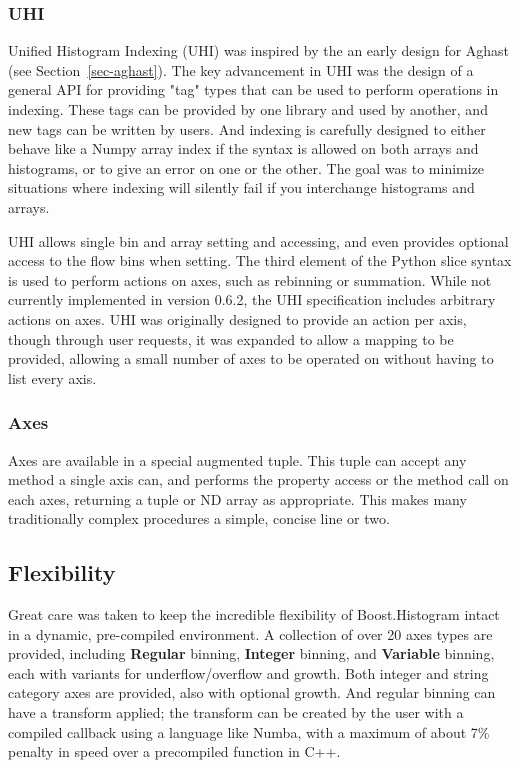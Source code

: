 \documentclass{webofc}
\begin{document}
\subsubsection{UHI}
\label{sec-bhp-uhi}

Unified Histogram Indexing (UHI) was inspired by the an early design for Aghast (see Section~\ref{sec-aghast}). The key advancement in UHI was the design of a general API for providing "tag" types that can be used to perform operations in indexing. These tags can be provided by one library and used by another, and new tags can be written by users. And indexing is carefully designed to either behave like a Numpy array index if the syntax is allowed on both arrays and histograms, or to give an error on one or the other. The goal was to minimize situations where indexing will silently fail if you interchange histograms and arrays.

UHI allows single bin and array setting and accessing, and even provides optional access to the flow bins when setting. The third element of the Python slice syntax is used to perform actions on axes, such as rebinning or summation. While not currently implemented in version 0.6.2, the UHI specification includes arbitrary actions on axes. UHI was originally designed to provide an action per axis, though through user requests, it was expanded to allow a mapping to be provided, allowing a small number of axes to be operated on without having to list every axis.

\subsubsection{Axes}
\label{sec-bhp-axes}

Axes are available in a special augmented tuple. This tuple can accept any method a single axis can, and performs the property access or the method call on each axes, returning a tuple or ND array as appropriate. This makes many traditionally complex procedures a simple, concise line or two.

\subsection{Flexibility}

Great care was taken to keep the incredible flexibility of Boost.Histogram intact in a dynamic, pre-compiled environment. A collection of over 20 axes types are provided, including \textbf{Regular} binning, \textbf{Integer} binning, and \textbf{Variable} binning, each with variants for underflow/overflow and growth. Both integer and string category axes are provided, also with optional growth. And regular binning can have a transform applied; the transform can be created by the user with a compiled callback using a language like Numba, with a maximum of about 7\% penalty in speed over a precompiled function in C++.
\end{document}

